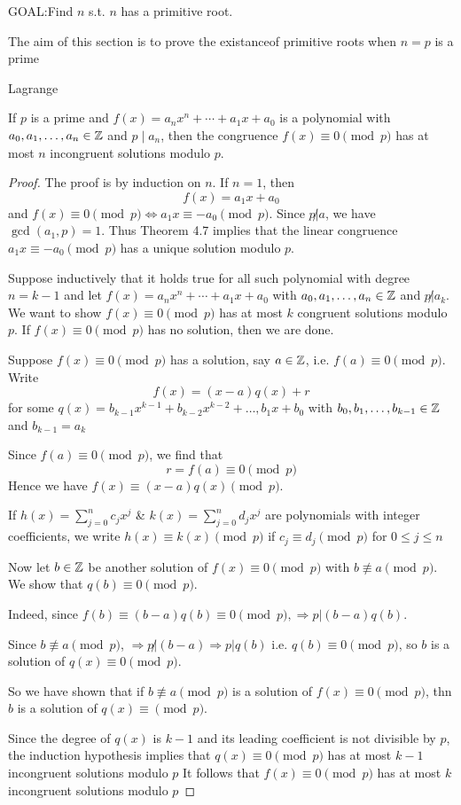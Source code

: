 GOAL:\@ Find $n$ s.t. $n$ has a primitive root.

The aim of this section is to prove the existanceof primitive roots 
when $n = p$ is a prime

\begin{theorem}
    Lagrange

    If $p$ is a prime and $f(x) = a_n x^n + \cdots + a_1x + a_0$
    is a polynomial with $a_0, a_1, \dots, a_n \in \mathbb{Z}$ and $p\;|\;a_n$, 
    then the congruence $f(x) \equiv 0 \pmod p$ has at most $n$ incongruent 
    solutions modulo $p$.
\end{theorem}
\begin{proof}
    The proof is by induction on $n$. If $n = 1$, then 
    \[
        f(x) = a_1 x + a_0
    \]
    and $f(x) \equiv 0 \pmod p \iff a_1 x \equiv -a_0 \pmod p$.
    Since $\displaystyle p \not| a$, we have $\gcd(a_1, p) = 1$. Thus
    Theorem 4.7 implies that the linear congruence $a_1 x\equiv -a_0 \pmod p$
    has a unique solution modulo $p$.

    Suppose inductively that it holds true for all such polynomial with degree $n = k-1$
    and let $f(x) = a_n x^n + \cdots + a_1x + a_0$ with $a_0, a_1, \dots, a_n \in \mathbb{Z}$ and
    $p \not| a_k$. We want to show $f(x) \equiv 0 \pmod p$ has at most $k$ congruent solutions
    modulo $p$.
    If $f(x) \equiv 0 \pmod p$ has no solution, then we are done.

    Suppose $f(x) \equiv 0 \pmod p$ has a solution, say $a \in \mathbb{Z}$, i.e. $f(a) \equiv 0 \pmod p$.
    Write
    \[
        f(x) = (x-a)q(x) + r
    \]
    for some $q(x) = b_{k-1} x^{k-1} + b_{k-2} x^{k-2} + \dots, b_1 x + b_0$
    with $b_0, b_1, \dots, b_{k-1} \in \mathbb{Z}$ and $b_{k-1} = a_k$

    Since $f(a) \equiv 0 \pmod p$, we find that 
    \[  
        r = f(a) \equiv 0 \pmod p
    \]
    Hence we have $f(x) \equiv (x-a)q(x) \pmod p$.

    If $h(x) = \sum_{j=0}^{n}{c_j x^j}$ \& $k(x) = \sum_{j=0}^{n}{d_j x^j}$
    are polynomials with integer coefficients, we write $h(x) \equiv k(x) \pmod p$
    if $c_j \equiv d_j \pmod p$ for $0 \leq j \leq n$

    Now let $b \in \mathbb{Z}$ be another solution of $f(x) \equiv 0 \pmod p$ with 
    $b \not\equiv a \pmod p$. We show that $q(b) \equiv 0 \pmod p$.

    Indeed, since $f(b) \equiv (b - a)q(b) \equiv 0 \pmod p, \Rightarrow p| (b-a)q(b)$.

    Since $b \not\equiv a \pmod p$, $\Rightarrow p \not| (b-a) \Rightarrow p | q(b)$
    i.e. $q(b) \equiv 0 \pmod p$, so $b$ is a solution of $q(x) \equiv 0 \pmod p$.

    So we have shown that if $b \not\equiv a \pmod p$ is a solution of $f(x) \equiv 0 \pmod p$,
    thn $b$ is a solution of $q(x) \equiv \pmod p$.

    Since the degree of $q(x)$ is $k-1$ and its leading coefficient is not divisible by $p$, the induction hypothesis
    implies that $q(x) \equiv 0 \pmod p$ has at most 
    $k-1$ incongruent solutions modulo $p$ It follows that $f(x) \equiv 0 \pmod p$ has at most $k$ incongruent solutions modulo $p$
\end{proof}

